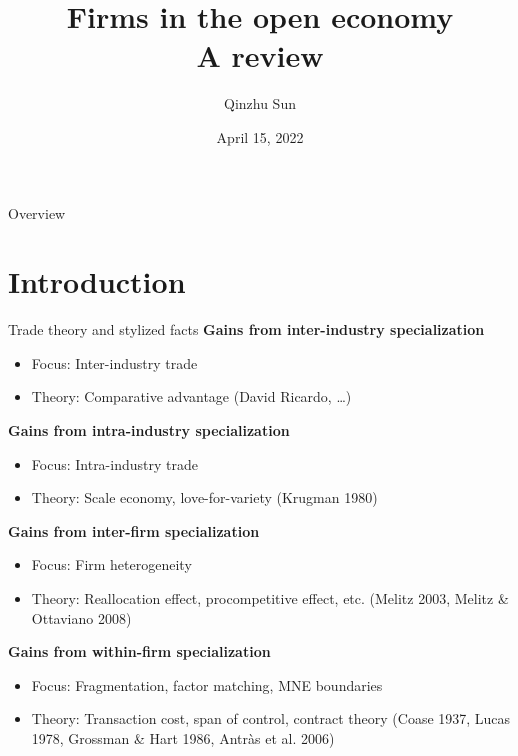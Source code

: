 \documentclass{beamer}
\title[Firms in the open economy]{Firms in the open economy \\ {\small A review}}
\author{Qinzhu Sun}
\institute[]{}
\date{April 15, 2022}
\begin{document}
\begin{frame}
	\titlepage
\end{frame}

\begin{frame}{Overview}
	\tableofcontents
\end{frame}
\section{Introduction}
\begin{frame}[shrink]
	\transfade %
	\tableofcontents[sectionstyle=show/shaded,subsectionstyle=show/shaded/hide]
	\addtocounter{framenumber}{-1}
\end{frame}
\begin{frame}{Trade theory and stylized facts}
	\textbf{Gains from inter-industry specialization}
	\begin{itemize}
		\item Focus: Inter-industry trade
		\item Theory: Comparative advantage (David Ricardo, \dots)
	\end{itemize}
	\textbf{Gains from intra-industry specialization}
	\begin{itemize}
		\item Focus: Intra-industry trade
		\item Theory: Scale economy, love-for-variety (Krugman 1980)
	\end{itemize}
	\textbf{Gains from inter-firm specialization}
	\begin{itemize}
		\item Focus: Firm heterogeneity
		\item Theory: Reallocation effect, procompetitive effect, etc. (Melitz 2003, Melitz \& Ottaviano 2008)
	\end{itemize}
	\textbf{Gains from within-firm specialization}
	\begin{itemize}
		\item Focus: Fragmentation, factor matching, MNE boundaries
		\item Theory: Transaction cost, span of control, contract theory (Coase 1937, Lucas 1978, Grossman \& Hart 1986, Antr\`as et al. 2006)
	\end{itemize}
\end{frame}
\end{document}
